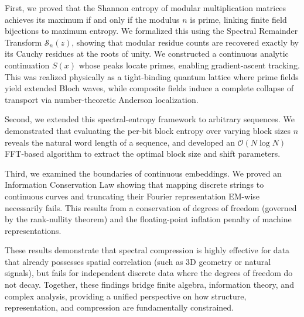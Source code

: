 \documentclass[11pt,twoside]{article}
\begin{document}
First, we proved that the Shannon entropy of modular multiplication matrices achieves its maximum if and only if the modulus $n$ is prime, linking finite field bijections to maximum entropy. We formalized this using the Spectral Remainder Transform $\mathcal{S}_n(z)$, showing that modular residue counts are recovered exactly by its Cauchy residues at the roots of unity. We constructed a continuous analytic continuation $S(x)$ whose peaks locate primes, enabling gradient-ascent tracking. This was realized physically as a tight-binding quantum lattice where prime fields yield extended Bloch waves, while composite fields induce a complete collapse of transport via number-theoretic Anderson localization.

Second, we extended this spectral-entropy framework to arbitrary sequences. We demonstrated that evaluating the per-bit block entropy over varying block sizes $n$ reveals the natural word length of a sequence, and developed an $\mathcal{O}(N \log N)$ FFT-based algorithm to extract the optimal block size and shift parameters.

Third, we examined the boundaries of continuous embeddings. We proved an Information Conservation Law showing that mapping discrete strings to continuous curves and truncating their Fourier representation EM-wise necessarily fails. This results from a conservation of degrees of freedom (governed by the rank-nullity theorem) and the floating-point inflation penalty of machine representations. 

These results demonstrate that spectral compression is highly effective for data that already possesses spatial correlation (such as 3D geometry or natural signals), but fails for independent discrete data where the degrees of freedom do not decay. Together, these findings bridge finite algebra, information theory, and complex analysis, providing a unified perspective on how structure, representation, and compression are fundamentally constrained.
	
\end{document}
